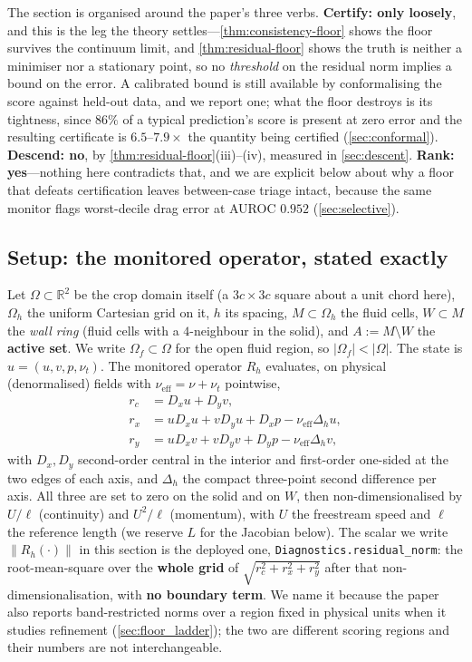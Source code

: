 The section is organised around the paper's three verbs. \textbf{Certify: only loosely},
and this is the leg the theory settles---\autoref{thm:consistency-floor} shows the floor
survives the continuum limit, and \autoref{thm:residual-floor} shows the truth is neither a
minimiser nor a stationary point, so no \emph{threshold} on the residual norm implies a
bound on the error. A calibrated bound is still available by conformalising the score
against held-out data, and we report one; what the floor destroys is its tightness, since
$86\%$ of a typical prediction's score is present at zero error and the resulting
certificate is $6.5$--$7.9\times$ the quantity being certified (\autoref{sec:conformal}).
\textbf{Descend: no}, by \autoref{thm:residual-floor}(iii)--(iv), measured in
\autoref{sec:descent}. \textbf{Rank: yes}---nothing here contradicts that, and we are
explicit below about why a floor that defeats certification leaves between-case triage
intact, because the same monitor flags worst-decile drag error at AUROC $0.952$
(\autoref{sec:selective}).

\subsection{Setup: the monitored operator, stated exactly}
\label{sec:rf_operator}

Let $\Omega\subset\mathbb{R}^2$ be the crop domain itself (a $3c\times3c$ square about a
unit chord here), $\Omega_h$ the uniform Cartesian grid on it, $h$ its spacing,
$M\subset\Omega_h$ the fluid cells, $W\subset M$ the \emph{wall ring} (fluid cells with a
$4$-neighbour in the solid), and $A:=M\setminus W$ the \textbf{active set}. We write
$\Omega_f\subset\Omega$ for the open fluid region, so $|\Omega_f|<|\Omega|$. The state is
$u=(u,v,p,\nu_t)$. The monitored operator $R_h$ evaluates, on physical (denormalised)
fields with $\nu_{\mathrm{eff}}=\nu+\nu_t$ pointwise,
\begin{equation}
\begin{aligned}
r_c&=D_xu+D_yv,\\
r_x&=uD_xu+vD_yu+D_xp-\nu_{\mathrm{eff}}\Delta_hu,\\
r_y&=uD_xv+vD_yv+D_yp-\nu_{\mathrm{eff}}\Delta_hv,
\end{aligned}
\label{eq:monitored}
\end{equation}
with $D_x,D_y$ second-order central in the interior and first-order one-sided at the two
edges of each axis, and $\Delta_h$ the compact three-point second difference per axis. All
three are set to zero on the solid and on $W$, then non-dimensionalised by $U/\ell$ (continuity)
and $U^2/\ell$ (momentum), with $U$ the freestream speed and $\ell$ the reference length
(we reserve $L$ for the Jacobian below). The scalar we write $\|R_h(\cdot)\|$ in this section is the deployed one,
\texttt{Diagnostics.residual\_norm}: the root-mean-square over the \textbf{whole grid} of
$\sqrt{r_c^2+r_x^2+r_y^2}$ after that non-dimensionalisation, with \textbf{no boundary term}.
We name it because the paper also reports band-restricted norms over a region fixed in
physical units when it studies refinement (\autoref{sec:floor_ladder}); the two are
different scoring regions and their numbers are not interchangeable.

